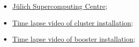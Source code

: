 \documentclass{beamer}
\begin{document}
\begin{frame}
  \begin{itemize}
    \item \href{https://www.fz-juelich.de/ias/jsc/EN/Home/home_node.html}{Jülich Supercomputing Centre};
    \item \href{https://www.youtube.com/watch?v=7h6mYU2HDTA}{Time lapse video of cluster installation};
    \item \href{https://www.youtube.com/watch?v=S84vRFSc-vM}{Time lapse video of booster installation};
  \end{itemize}
\end{frame}
\end{document}
